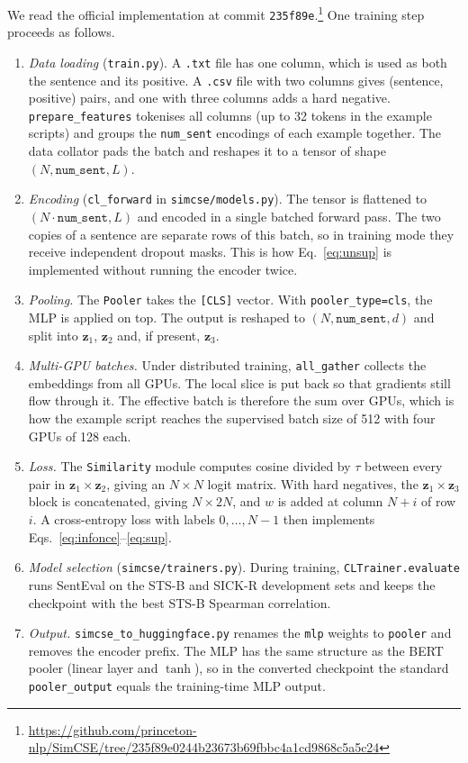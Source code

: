 We read the official implementation at commit
\texttt{235f89e}.\footnote{\url{https://github.com/princeton-nlp/SimCSE/tree/235f89e0244b23673b69fbbc4a1cd9868c5a5c24}}
One training step proceeds as follows.
\begin{enumerate}
\item \emph{Data loading} (\texttt{train.py}). A \texttt{.txt} file has one
column, which is used as both the sentence and its positive. A \texttt{.csv}
file with two columns gives (sentence, positive) pairs, and one with three
columns adds a hard negative. \texttt{prepare\_features} tokenises all columns
(up to 32 tokens in the example scripts) and groups the \texttt{num\_sent}
encodings of each example together. The data collator pads the batch and
reshapes it to a tensor of shape $(N, \texttt{num\_sent}, L)$.
\item \emph{Encoding} (\texttt{cl\_forward} in \texttt{simcse/models.py}). The
tensor is flattened to $(N\cdot\texttt{num\_sent}, L)$ and encoded in a single
batched forward pass. The two copies of a sentence are separate rows of this
batch, so in training mode they receive independent dropout masks. This is how
Eq.~\eqref{eq:unsup} is implemented without running the encoder twice.
\item \emph{Pooling.} The \texttt{Pooler} takes the \texttt{[CLS]} vector. With
\texttt{pooler\_type=cls}, the MLP is applied on top. The output is reshaped to
$(N,\texttt{num\_sent},d)$ and split into $\mathbf{z}_1$, $\mathbf{z}_2$ and,
if present, $\mathbf{z}_3$.
\item \emph{Multi-GPU batches.} Under distributed training,
\texttt{all\_gather} collects the embeddings from all GPUs. The local slice is
put back so that gradients still flow through it. The effective batch is
therefore the sum over GPUs, which is how the example script reaches the
supervised batch size of 512 with four GPUs of 128 each.
\item \emph{Loss.} The \texttt{Similarity} module computes cosine divided by
$\tau$ between every pair in $\mathbf{z}_1\times\mathbf{z}_2$, giving an
$N\times N$ logit matrix. With hard negatives, the $\mathbf{z}_1\times\mathbf{z}_3$
block is concatenated, giving $N\times 2N$, and $w$ is added at column $N+i$ of
row $i$. A cross-entropy loss with labels $0,\dots,N-1$ then implements
Eqs.~\eqref{eq:infonce}--\eqref{eq:sup}.
\item \emph{Model selection} (\texttt{simcse/trainers.py}). During training,
\texttt{CLTrainer.evaluate} runs SentEval on the STS-B and SICK-R development
sets and keeps the checkpoint with the best STS-B Spearman correlation.
\item \emph{Output.} \texttt{simcse\_to\_huggingface.py} renames the
\texttt{mlp} weights to \texttt{pooler} and removes the encoder prefix. The MLP
has the same structure as the BERT pooler (linear layer and $\tanh$), so in the
converted checkpoint the standard \texttt{pooler\_output} equals the
training-time MLP output.
\end{enumerate}
